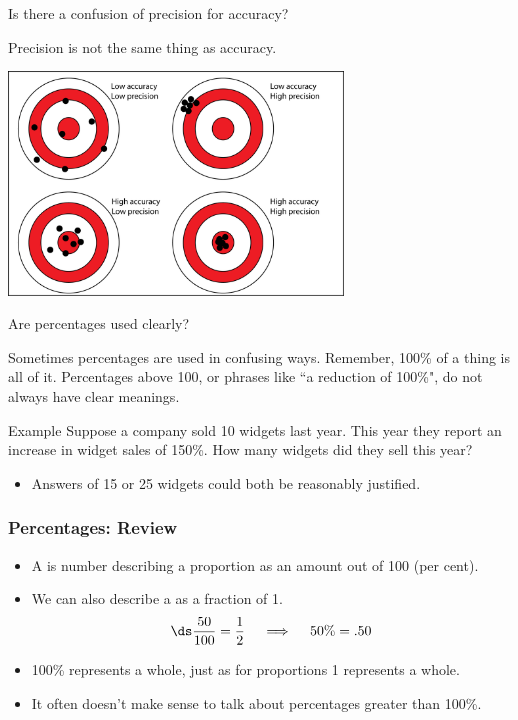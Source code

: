 \documentclass[xcolor=table, aspectratio=169, bigger, handout]{beamer}
\begin{document}
\begin{frame}{Is there a confusion of precision for accuracy?}

\begin{block}{}
Precision is not the same thing as accuracy.
\end{block}

\begin{center}
\includegraphics[width=3.5in]{../images/precision_accuracy}
\end{center}
\end{frame}

\begin{frame}{Are percentages used clearly?}

\begin{block}{}
Sometimes percentages are used in confusing ways. Remember, 100\% of a thing is all of it. Percentages above 100, or phrases like ``a reduction of 100\%", do not always have clear meanings. 
\end{block}

\begin{exampleblock}{Example}
Suppose a company sold 10 widgets last year. This year they report an increase in widget sales of 150\%. How many widgets did they sell this year?
\begin{itemize}
\item Answers of 15 or 25 widgets could both be reasonably justified. 
\end{itemize}
\end{exampleblock}

\end{frame}

\begin{frame}
\frametitle{Percentages: Review}

\begin{block}{}
\begin{itemize}
\item A  is number describing a proportion as an amount out of 100 (per cent).
\pause
\item We can also describe a  as a fraction of 1.
\[\ds \frac {50}{100} = \frac 1 2 \quad \implies \quad 50\% = .50\]
\pause
\item 100\% represents a whole, just as for proportions 1 represents a whole.
\pause
\item It often doesn't make sense to talk about percentages greater than 100\%.
\end{itemize}
\end{block}
\end{frame}
\end{document}
